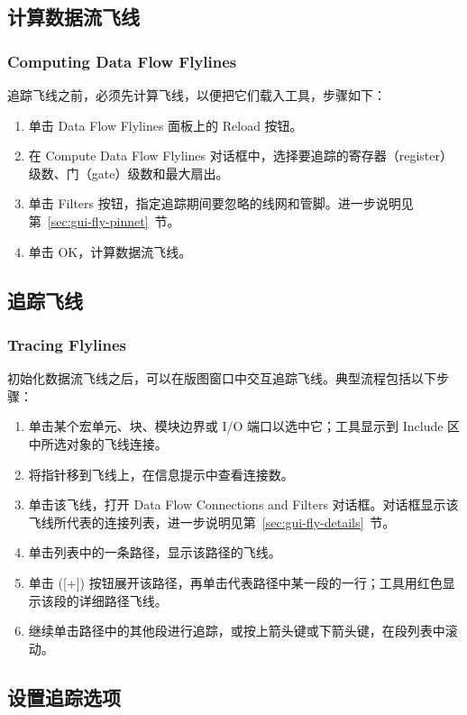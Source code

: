 \subsection{计算数据流飞线}
\label{sec:gui-fly-compute}
\subsubsection*{Computing Data Flow Flylines}

追踪飞线之前，必须先计算飞线，以便把它们载入工具，步骤如下：
\begin{enumerate}
  \item 单击 Data Flow Flylines 面板上的 Reload 按钮。
  \item 在 Compute Data Flow Flylines 对话框中，选择要追踪的寄存器（register）级数、门（gate）级数和最大扇出。
  \item 单击 Filters 按钮，指定追踪期间要忽略的线网和管脚。进一步说明见第~\ref{sec:gui-fly-pinnet}~节。
  \item 单击 OK，计算数据流飞线。
\end{enumerate}

\subsection{追踪飞线}
\subsubsection*{Tracing Flylines}

初始化数据流飞线之后，可以在版图窗口中交互追踪飞线。典型流程包括以下步骤：
\begin{enumerate}
  \item 单击某个宏单元、块、模块边界或 I/O 端口以选中它；工具显示到 Include 区中所选对象的飞线连接。
  \item 将指针移到飞线上，在信息提示中查看连接数。
  \item 单击该飞线，打开 Data Flow Connections and Filters 对话框。对话框显示该飞线所代表的连接列表，进一步说明见第~\ref{sec:gui-fly-details}~节。
  \item 单击列表中的一条路径，显示该路径的飞线。
  \item 单击 ([+]) 按钮展开该路径，再单击代表路径中某一段的一行；工具用红色显示该段的详细路径飞线。
  \item 继续单击路径中的其他段进行追踪，或按上箭头键或下箭头键，在段列表中滚动。
\end{enumerate}

\subsection{设置追踪选项}
